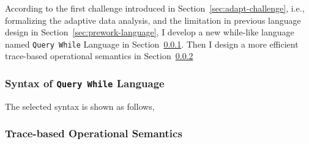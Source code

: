 According to the first challenge introduced in Section~\ref{sec:adapt-challenge}, i.e., formalizing the adaptive
data analysis,
and the limitation in previous language design in Section~\ref{sec:prework-language}, I develop a new while-like language named {\tt Query While} Language in
Section~\ref{sec:language-syntax}.
Then I design a more efficient trace-based operational semantics in Section~\ref{sec:language-os}
\subsubsection{Syntax of {\tt Query While} Language}
\label{sec:language-syntax}
The selected syntax is shown as follows,


\subsubsection{Trace-based Operational Semantics}
\label{sec:language-os}
